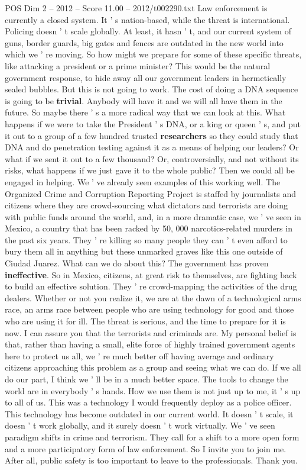 \begin{textsample}{POS Dim 2 – 2012 – Score 11.00 – 2012/t002290.txt}
Law enforcement is currently a closed system.
It ' s nation-based, while the threat is international.
Policing doesn ' t scale globally.
At least, it hasn ' t, and our current system of guns, border guards, big gates and fences are outdated in the new world into which we ' re moving.
So how might we prepare for some of these specific threats, like attacking a president or a prime minister?
This would be the natural government response, to hide away all our government leaders in hermetically sealed bubbles.
But this is not going to work.
The cost of doing a DNA sequence is going to be \textbf{trivial}.
Anybody will have it and we will all have them in the future.
So maybe there ' s a more radical way that we can look at this.
What happens if we were to take the President ' s DNA, or a king or queen ' s, and put it out to a group of a few hundred trusted \textbf{researchers} so they could study that DNA and do penetration testing against it as a means of helping our leaders?
Or what if we sent it out to a few thousand?
Or, controversially, and not without its risks, what happens if we just gave it to the whole public?
Then we could all be engaged in helping.
We ' ve already seen examples of this working well.
The Organized Crime and Corruption Reporting Project is staffed by journalists and citizens where they are crowd-sourcing what dictators and terrorists are doing with public funds around the world, and, in a more dramatic case, we ' ve seen in Mexico, a country that has been racked by 50, 000 narcotics-related murders in the past six years.
They ' re killing so many people they can ' t even afford to bury them all in anything but these unmarked graves like this one outside of Ciudad Juarez.
What can we do about this?
The government has proven \textbf{ineffective}.
So in Mexico, citizens, at great risk to themselves, are fighting back to build an effective solution.
They ' re crowd-mapping the activities of the drug dealers.
Whether or not you realize it, we are at the dawn of a technological arms race, an arms race between people who are using technology for good and those who are using it for ill.
The threat is serious, and the time to prepare for it is now.
I can assure you that the terrorists and criminals are.
My personal belief is that, rather than having a small, elite force of highly trained government agents here to protect us all, we ' re much better off having average and ordinary citizens approaching this problem as a group and seeing what we can do.
If we all do our part, I think we ' ll be in a much better space.
The tools to change the world are in everybody ' s hands.
How we use them is not just up to me, it ' s up to all of us.
This was a technology I would frequently deploy as a police officer.
This technology has become outdated in our current world.
It doesn ' t scale, it doesn ' t work globally, and it surely doesn ' t work virtually.
We ' ve seen paradigm shifts in crime and terrorism.
They call for a shift to a more open form and a more participatory form of law enforcement.
So I invite you to join me.
After all, public safety is too important to leave to the professionals.
Thank you.

\end{textsample}
